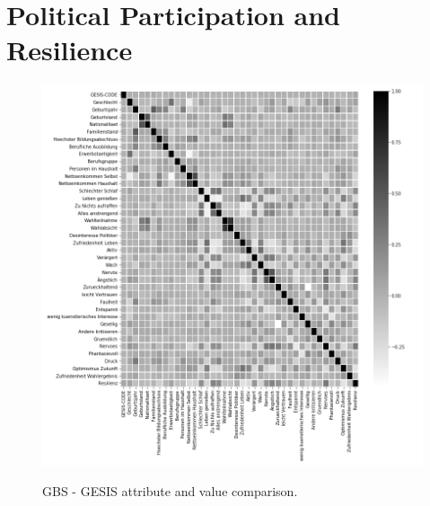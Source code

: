 \section{Political Participation and Resilience}

\begin{figure}[ht]
	\begin{center}
		\includegraphics[scale=0.52,angle=0]{fig/gesis_corr}
		\label{std}
		\caption{GBS - GESIS attribute and value comparison.}
	\end{center}
\end{figure}

